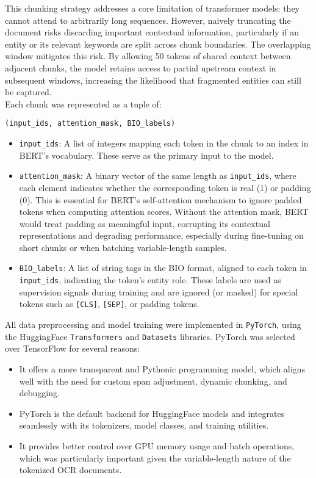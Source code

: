 \documentclass{article}
\begin{document}
This chunking strategy addresses a core limitation of transformer models: they cannot attend to arbitrarily long sequences. However, naively truncating the document risks discarding important contextual information, particularly if an entity or its relevant keywords are split across chunk boundaries. The overlapping window mitigates this risk. By allowing 50 tokens of shared context between adjacent chunks, the model retains access to partial upstream context in subsequent windows, increasing the likelihood that fragmented entities can still be captured. \\

Each chunk was represented as a tuple of:
\begin{verbatim}
(input_ids, attention_mask, BIO_labels)
\end{verbatim}

\begin{itemize}
    \item \texttt{input\_ids}: A list of integers mapping each token in the chunk to an index in BERT’s vocabulary. These serve as the primary input to the model.
    
    \item \texttt{attention\_mask}: A binary vector of the same length as \texttt{input\_ids}, where each element indicates whether the corresponding token is real (1) or padding (0). This is essential for BERT's self-attention mechanism to ignore padded tokens when computing attention scores. Without the attention mask, BERT would treat padding as meaningful input, corrupting its contextual representations and degrading performance, especially during fine-tuning on short chunks or when batching variable-length samples.

    \item \texttt{BIO\_labels}: A list of string tags in the BIO format, aligned to each token in \texttt{input\_ids}, indicating the token’s entity role. These labels are used as supervision signals during training and are ignored (or masked) for special tokens such as \texttt{[CLS]}, \texttt{[SEP]}, or padding tokens.
\end{itemize}

All data preprocessing and model training were implemented in \texttt{PyTorch}, using the HuggingFace \texttt{Transformers} and \texttt{Datasets} libraries. PyTorch was selected over TensorFlow for several reasons:
\begin{itemize}
    \item It offers a more transparent and Pythonic programming model, which aligns well with the need for custom span adjustment, dynamic chunking, and debugging.
    \item PyTorch is the default backend for HuggingFace models and integrates seamlessly with its tokenizers, model classes, and training utilities.
    \item It provides better control over GPU memory usage and batch operations, which was particularly important given the variable-length nature of the tokenized OCR documents.
\end{itemize}
\end{document}
